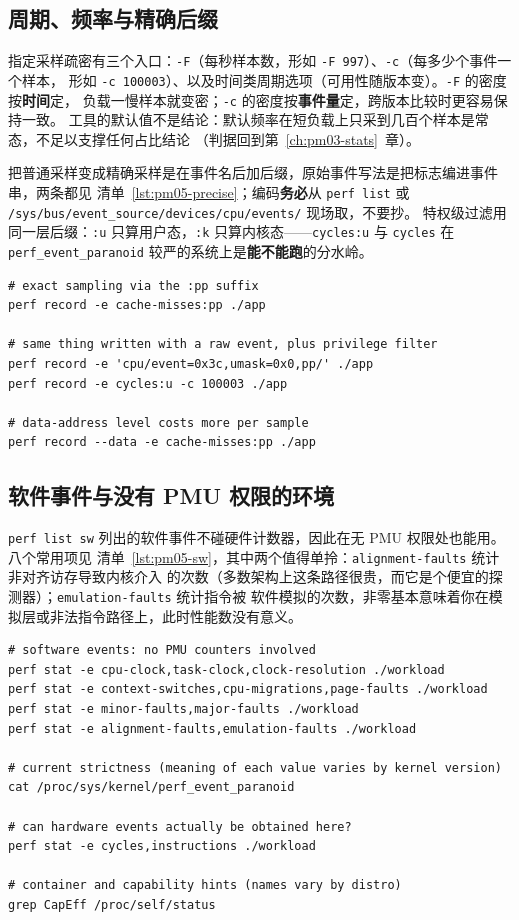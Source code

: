 \documentclass[12pt,a4paper,fontset=fandol]{ctexbook}
\newcommand{\Tp}[1]{\texttt{#1}}
\newcommand{\Bk}{\discretionary{}{}{}}
\begin{document}
\subsection*{周期、频率与精确后缀}

指定采样疏密有三个入口：\Tp{-F}（每秒样本数，形如 \Tp{-F 997}）、\Tp{-c}（每多少个事件一个样本，
形如 \Tp{-c 100003}）、以及时间类周期选项（可用性随版本变）。\Tp{-F} 的密度按\textbf{时间}定，
负载一慢样本就变密；\Tp{-c} 的密度按\textbf{事件量}定，跨版本比较时更容易保持一致。
工具的默认值不是结论：默认频率在短负载上只采到几百个样本是常态，不足以支撑任何占比结论
（判据回到第~\ref{ch:pm03-stats}~章）。

把普通采样变成精确采样是在事件名后加后缀，原始事件写法是把标志编进事件串，两条都见
清单~\ref{lst:pm05-precise}；编码\textbf{务必}从 \Tp{perf list} 或
\Tp{/sys/bus/{\Bk}event\_source{\Bk}/devices{\Bk}/cpu{\Bk}/events/} 现场取，不要抄。
特权级过滤用同一层后缀：\Tp{:u} 只算用户态，\Tp{:k} 只算内核态——\Tp{cycles:u} 与 \Tp{cycles}
在 \Tp{perf\_event{\Bk}\_paranoid} 较严的系统上是\textbf{能不能跑}的分水岭。

\begin{lstlisting}[style=shellstyle, label={lst:pm05-precise},
  title={精确采样与原始事件写法（编码随型号变）}]
# exact sampling via the :pp suffix
perf record -e cache-misses:pp ./app

# same thing written with a raw event, plus privilege filter
perf record -e 'cpu/event=0x3c,umask=0x0,pp/' ./app
perf record -e cycles:u -c 100003 ./app

# data-address level costs more per sample
perf record --data -e cache-misses:pp ./app
\end{lstlisting}

\subsection*{软件事件与没有 PMU 权限的环境}

\Tp{perf list sw} 列出的软件事件不碰硬件计数器，因此在无 PMU 权限处也能用。八个常用项见
清单~\ref{lst:pm05-sw}，其中两个值得单拎：\Tp{alignment{\Bk}-faults} 统计非对齐访存导致内核介入
的次数（多数架构上这条路径很贵，而它是个便宜的探测器）；\Tp{emulation{\Bk}-faults} 统计指令被
软件模拟的次数，非零基本意味着你在模拟层或非法指令路径上，此时性能数没有意义。

\begin{lstlisting}[style=shellstyle, label={lst:pm05-sw},
  title={无 PMU 也可用的软件事件与权限自查}]
# software events: no PMU counters involved
perf stat -e cpu-clock,task-clock,clock-resolution ./workload
perf stat -e context-switches,cpu-migrations,page-faults ./workload
perf stat -e minor-faults,major-faults ./workload
perf stat -e alignment-faults,emulation-faults ./workload

# current strictness (meaning of each value varies by kernel version)
cat /proc/sys/kernel/perf_event_paranoid

# can hardware events actually be obtained here?
perf stat -e cycles,instructions ./workload

# container and capability hints (names vary by distro)
grep CapEff /proc/self/status
\end{lstlisting}
\end{document}
